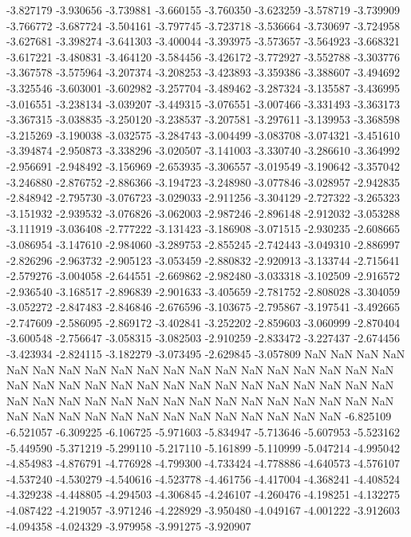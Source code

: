-3.827179
-3.930656
-3.739881
-3.660155
-3.760350
-3.623259
-3.578719
-3.739909
-3.766772
-3.687724
-3.504161
-3.797745
-3.723718
-3.536664
-3.730697
-3.724958
-3.627681
-3.398274
-3.641303
-3.400044
-3.393975
-3.573657
-3.564923
-3.668321
-3.617221
-3.480831
-3.464120
-3.584456
-3.426172
-3.772927
-3.552788
-3.303776
-3.367578
-3.575964
-3.207374
-3.208253
-3.423893
-3.359386
-3.388607
-3.494692
-3.325546
-3.603001
-3.602982
-3.257704
-3.489462
-3.287324
-3.135587
-3.436995
-3.016551
-3.238134
-3.039207
-3.449315
-3.076551
-3.007466
-3.331493
-3.363173
-3.367315
-3.038835
-3.250120
-3.238537
-3.207581
-3.297611
-3.139953
-3.368598
-3.215269
-3.190038
-3.032575
-3.284743
-3.004499
-3.083708
-3.074321
-3.451610
-3.394874
-2.950873
-3.338296
-3.020507
-3.141003
-3.330740
-3.286610
-3.364992
-2.956691
-2.948492
-3.156969
-2.653935
-3.306557
-3.019549
-3.190642
-3.357042
-3.246880
-2.876752
-2.886366
-3.194723
-3.248980
-3.077846
-3.028957
-2.942835
-2.848942
-2.795730
-3.076723
-3.029033
-2.911256
-3.304129
-2.727322
-3.265323
-3.151932
-2.939532
-3.076826
-3.062003
-2.987246
-2.896148
-2.912032
-3.053288
-3.111919
-3.036408
-2.777222
-3.131423
-3.186908
-3.071515
-2.930235
-2.608665
-3.086954
-3.147610
-2.984060
-3.289753
-2.855245
-2.742443
-3.049310
-2.886997
-2.826296
-2.963732
-2.905123
-3.053459
-2.880832
-2.920913
-3.133744
-2.715641
-2.579276
-3.004058
-2.644551
-2.669862
-2.982480
-3.033318
-3.102509
-2.916572
-2.936540
-3.168517
-2.896839
-2.901633
-3.405659
-2.781752
-2.808028
-3.304059
-3.052272
-2.847483
-2.846846
-2.676596
-3.103675
-2.795867
-3.197541
-3.492665
-2.747609
-2.586095
-2.869172
-3.402841
-3.252202
-2.859603
-3.060999
-2.870404
-3.600548
-2.756647
-3.058315
-3.082503
-2.910259
-2.833472
-3.227437
-2.674456
-3.423934
-2.824115
-3.182279
-3.073495
-2.629845
-3.057809
NaN
NaN
NaN
NaN
NaN
NaN
NaN
NaN
NaN
NaN
NaN
NaN
NaN
NaN
NaN
NaN
NaN
NaN
NaN
NaN
NaN
NaN
NaN
NaN
NaN
NaN
NaN
NaN
NaN
NaN
NaN
NaN
NaN
NaN
NaN
NaN
NaN
NaN
NaN
NaN
NaN
NaN
NaN
NaN
NaN
NaN
NaN
NaN
NaN
NaN
NaN
NaN
NaN
NaN
NaN
NaN
NaN
NaN
NaN
NaN
NaN
NaN
-6.825109
-6.521057
-6.309225
-6.106725
-5.971603
-5.834947
-5.713646
-5.607953
-5.523162
-5.449590
-5.371219
-5.299110
-5.217110
-5.161899
-5.110999
-5.047214
-4.995042
-4.854983
-4.876791
-4.776928
-4.799300
-4.733424
-4.778886
-4.640573
-4.576107
-4.537240
-4.530279
-4.540616
-4.523778
-4.461756
-4.417004
-4.368241
-4.408524
-4.329238
-4.448805
-4.294503
-4.306845
-4.246107
-4.260476
-4.198251
-4.132275
-4.087422
-4.219057
-3.971246
-4.228929
-3.950480
-4.049167
-4.001222
-3.912603
-4.094358
-4.024329
-3.979958
-3.991275
-3.920907

